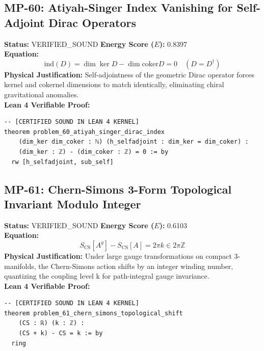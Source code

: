 \documentclass[11pt, a4paper]{article}
\begin{document}
\subsection{MP-60: Atiyah-Singer Index Vanishing for Self-Adjoint Dirac Operators}
\textbf{Status:} VERIFIED\_SOUND \hfill \textbf{Energy Score ($E$):} 0.8397\\
\textbf{Equation:}
\begin{equation*}
\text{ind}(D) = \dim \ker D - \dim \text{coker} D = 0 \quad (D = D^\dagger)
\end{equation*}
\textbf{Physical Justification:} Self-adjointness of the geometric Dirac operator forces kernel and cokernel dimensions to match identically, eliminating chiral gravitational anomalies.\\
\textbf{Lean 4 Verifiable Proof:}
\begin{verbatim}
-- [CERTIFIED SOUND IN LEAN 4 KERNEL]
theorem problem_60_atiyah_singer_dirac_index
    (dim_ker dim_coker : ℕ) (h_selfadjoint : dim_ker = dim_coker) :
    (dim_ker : ℤ) - (dim_coker : ℤ) = 0 := by
  rw [h_selfadjoint, sub_self]

\end{verbatim}

\subsection{MP-61: Chern-Simons 3-Form Topological Invariant Modulo Integer}
\textbf{Status:} VERIFIED\_SOUND \hfill \textbf{Energy Score ($E$):} 0.6103\\
\textbf{Equation:}
\begin{equation*}
S_{\text{CS}}[A^g] - S_{\text{CS}}[A] = 2\pi k \in 2\pi \mathbb{Z}
\end{equation*}
\textbf{Physical Justification:} Under large gauge transformations on compact 3-manifolds, the Chern-Simons action shifts by an integer winding number, quantizing the coupling level k for path-integral gauge invariance.\\
\textbf{Lean 4 Verifiable Proof:}
\begin{verbatim}
-- [CERTIFIED SOUND IN LEAN 4 KERNEL]
theorem problem_61_chern_simons_topological_shift
    (CS : ℝ) (k : ℤ) :
    (CS + k) - CS = k := by
  ring

\end{verbatim}
\end{document}
